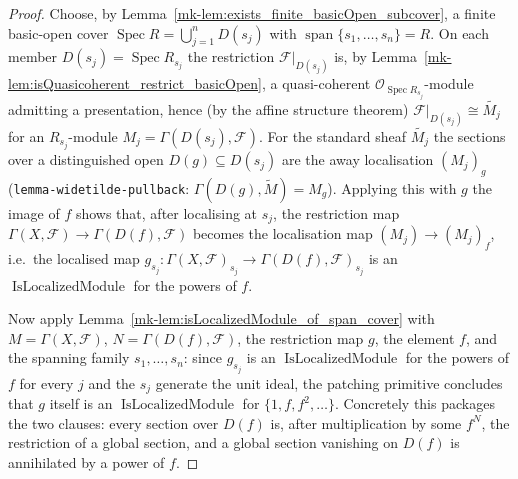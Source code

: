 \begin{proof}
  Choose, by Lemma~\ref{mk-lem:exists_finite_basicOpen_subcover}, a finite basic-open cover
  \(\operatorname{Spec} R = \bigcup_{j=1}^{n} D(s_j)\) with
  \(\operatorname{span}\{s_1, \ldots, s_n\} = R\). On each member
  \(D(s_j) = \operatorname{Spec} R_{s_j}\) the restriction \(\mathcal{F}|_{D(s_j)}\) is, by
  Lemma~\ref{mk-lem:isQuasicoherent_restrict_basicOpen}, a quasi-coherent
  \(\mathcal{O}_{\operatorname{Spec} R_{s_j}}\)-module admitting a presentation, hence (by the
  affine structure theorem) \(\mathcal{F}|_{D(s_j)} \cong \widetilde{M_j}\) for an
  \(R_{s_j}\)-module \(M_j = \Gamma(D(s_j), \mathcal{F})\). For the standard sheaf
  \(\widetilde{M_j}\) the sections over a distinguished open \(D(g) \subseteq D(s_j)\) are
  the away localisation \((M_j)_g\) (\texttt{lemma-widetilde-pullback}:
  \(\Gamma(D(g), \widetilde{M}) = M_g\)). Applying this with \(g\) the image of \(f\) shows
  that, after localising at \(s_j\), the restriction map
  \(\Gamma(X, \mathcal{F}) \to \Gamma(D(f), \mathcal{F})\) becomes the localisation map
  \((M_j) \to (M_j)_f\), i.e.\ the localised map
  \(g_{s_j} : \Gamma(X, \mathcal{F})_{s_j} \to \Gamma(D(f), \mathcal{F})_{s_j}\) is an
  \(\operatorname{IsLocalizedModule}\) for the powers of \(f\).

  Now apply Lemma~\ref{mk-lem:isLocalizedModule_of_span_cover} with \(M = \Gamma(X, \mathcal{F})\),
  \(N = \Gamma(D(f), \mathcal{F})\), the restriction map \(g\), the element \(f\), and the
  spanning family \(s_1, \ldots, s_n\): since \(g_{s_j}\) is an
  \(\operatorname{IsLocalizedModule}\) for the powers of \(f\) for every \(j\) and the
  \(s_j\) generate the unit ideal, the patching primitive concludes that \(g\) itself is an
  \(\operatorname{IsLocalizedModule}\) for \(\{1, f, f^2, \ldots\}\). Concretely this packages
  the two clauses: every section over \(D(f)\) is, after multiplication by some \(f^N\), the
  restriction of a global section, and a global section vanishing on \(D(f)\) is annihilated
  by a power of \(f\).
\end{proof}

